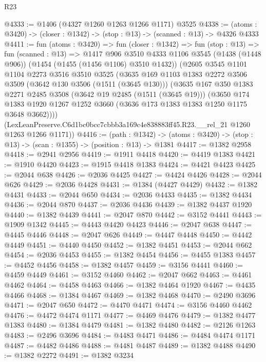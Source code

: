 \begin{lexlean}{R23}
\begin{coremodule}
@4333 := @1406 (@4327 @1260 @1263 @1266 @1171) @3525
@4338 := (atoms : @3420) -> (closer : @1342) -> (stop : @13) -> (scanned : @13) -> @4326 @4333
@4411 := fun (atoms : @3420) =>
  fun (closer : @1342) =>
  fun (stop : @13) =>
  fun (scanned : @13) =>
  @1417
    @906
    @3510
    @4333
    @1106
    @3545
    (@1438 (@1448 @906))
    (@1454 (@1455 (@1456 @1106) @3510 @1432))
    (@2605
      @3545
      @1101
      @1104
      @2273
      @3516
      @3510
      @3525
      (@3635
        @169
        @1103
        @1383
        @2272
        @3506
        @3509
        (@3642 @130 @3506 (@1511 (@3645 @130)))
        (@3635
          @167
          @350
          @1383
          @2271
          @2485
          @3508
          (@3642 @19 @2485 (@1511 (@3645 @19)))
          (@3650
            @174
            @1383
            @1920
            @1267
            @1252
            @3660
            (@3636 @173 @1383 @1383 @1250 @1175 @3648 @3662))))
      (LexLeanPreserve.C6d1bc0bcc7cbbb3a169c4e838883ff45.R23.__rel_21 @1260 @1263 @1266 @1171))
@4416 := (path : @1342) ->
  (atoms : @3420) -> (stop : @13) -> (scan : @1355) -> (position : @13) -> @1381
@4417 := @1382 @2958
@4418 := @2941 @2956
@4419 := @1911 @4418
@4420 := @4419 @1383
@4421 := @1910 @4420
@4423 := @1915 @4418 @1383
@4424 := @4421 @4423
@4425 := @2044 @638
@4426 := @2036 @4425
@4427 := @4424 @4426
@4428 := @2044 @626
@4429 := @2036 @4428
@4431 := @1384 (@4427 @4429)
@4432 := @1382 @4431
@4433 := @2044 @650
@4434 := @2036 @4433
@4435 := @1382 @4434
@4436 := @2044 @870
@4437 := @2036 @4436
@4439 := @1382 @4437 @1920
@4440 := @1382 @4439
@4441 := @2047 @870
@4442 := @3152 @4441
@4443 := @1909 @1342
@4445 := @4443 @4420 @4423
@4446 := @2047 @638
@4447 := @4445 @4446
@4448 := @2047 @626
@4449 := @4447 @4448
@4450 := @4442 @4449
@4451 := @4440 @4450
@4452 := @1382 @4451
@4453 := @2044 @662
@4454 := @2036 @4453
@4455 := @1382 @4454
@4456 := @4455 @1383
@4457 := @4452 @4456
@4458 := @1382 @4457
@4459 := @3156 @4441
@4460 := @4459 @4449
@4461 := @3152 @4460
@4462 := @2047 @662
@4463 := @4461 @4462
@4464 := @4458 @4463
@4466 := @1382 @4464 @1920
@4467 := @4435 @4466
@4468 := @1384 @4467
@4469 := @1382 @4468
@4470 := @2490 @3696
@4471 := @2047 @650
@4472 := @4470 @4471
@4474 := @3156 @4460 @4462
@4476 := @4472 @4474 @1171
@4477 := @4469 @4476
@4479 := @1382 @4477 @1383
@4480 := @1384 @4479
@4481 := @1382 @4480
@4482 := @2126 @1263
@4483 := @2496 @3696
@4484 := @4483 @4471
@4486 := @4484 @4474 @1171
@4487 := @4482 @4486
@4488 := @4481 @4487
@4489 := @1382 @4488
@4490 := @1382 @2272
@4491 := @1382 @3234

\end{coremodule}
\end{lexlean}
